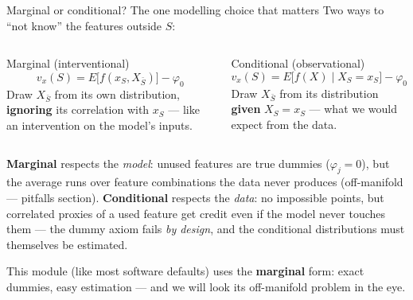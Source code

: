 \documentclass[aspectratio=169,11pt]{beamer}
\begin{document}
\begin{frame}{Marginal or conditional? The one modelling choice that matters}
  \footnotesize
  Two ways to ``not know'' the features outside $S$:
  \begin{columns}[T]
    \begin{block}{Marginal (interventional)}
      \[ v_x(S) = E\bigl[f(x_S, X_{\bar S})\bigr] - \varphi_0 \]
      Draw $X_{\bar S}$ from its own distribution, \textbf{ignoring} its
      correlation with $x_S$ --- like an intervention on the model's inputs.
    \end{block}
    \begin{block}{Conditional (observational)}
      \[ v_x(S) = E\bigl[f(X) \mid X_S = x_S\bigr] - \varphi_0 \]
      Draw $X_{\bar S}$ from its distribution \textbf{given} $X_S=x_S$ ---
      what we would expect from the data.
    \end{block}
  \end{columns}
  \vspace{2pt}
  \begin{readme}
    \textbf{Marginal} respects the \emph{model}: unused features are true dummies
    ($\varphi_j=0$), but the average runs over feature combinations the data never
    produces (off-manifold --- pitfalls section). \textbf{Conditional} respects the
    \emph{data}: no impossible points, but correlated proxies of a used feature get
    credit even if the model never touches them --- the dummy axiom fails \emph{by
    design}, and the conditional distributions must themselves be estimated.
  \end{readme}
  \begin{takeaway}
    This module (like most software defaults) uses the \textbf{marginal} form: exact
    dummies, easy estimation --- and we will look its off-manifold problem in the eye.
  \end{takeaway}
\end{frame}
\end{document}

